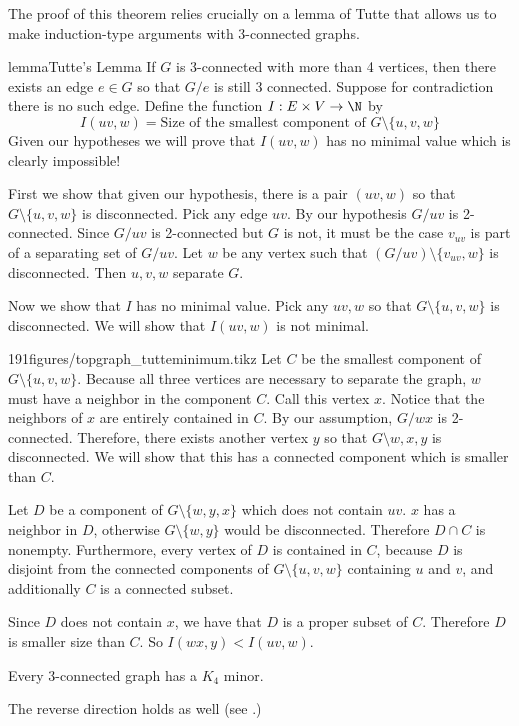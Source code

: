  The proof of this theorem relies crucially on a lemma of Tutte that allows us to make induction-type arguments with 3-connected graphs.
\begin{framedpage}{lemma}{Tutte's Lemma}{\label{lem:graph:tutte}
  If $G$  is 3-connected with more than 4 vertices, then there exists an edge $e\in G$ so that $G/e$ is still 3 connected.}
  Suppose for contradiction there is no such edge. Define the function $I: E\times V \to \N$ by
  \[
   I(uv, w)=\text{Size of the smallest component of $G\setminus \{u,v, w\}$}
  \]
	Given our hypotheses we will prove that $I(uv, w)$ has no minimal value which is clearly impossible!

First we show that given our hypothesis, there is a pair $(uv, w)$ so that $G\setminus\{u, v, w\}$ is disconnected. Pick any edge $uv$. By our hypothesis $G/uv$ is   2-connected. Since $G/uv$ is 2-connected but $G$ is not, it must be the case $v_{uv}$ is part of a separating set of $G/uv$. Let $w$ be any vertex such that $(G/uv)\setminus\{v_{uv}, w\}$ is disconnected. Then $u, v, w$ separate $G$.

Now we show that  $I$ has no minimal value.
Pick any $uv, w$ so that $G\setminus\{u, v, w\}$ is disconnected. 
We will show that $I(uv, w)$ is not minimal.
\begin{paragraphfigureenv}{191figures/topgraph_tutteminimum.tikz}
	Let $C$ be the smallest component of $G\setminus\{u, v, w\}$. Because all three vertices are necessary to separate the graph,  $w$ must have a neighbor in the component $C$. Call this vertex $x$. Notice that the neighbors of $x$ are entirely contained in $C$.
	By our assumption, $G/wx$ is 2-connected.
	Therefore, there exists another vertex $y$ so that $G\setminus{w, x, y}$ is disconnected. We will show that this has a connected component which is smaller than $C$.

	Let $D$ be a component of $G\setminus\{w, y, x\}$ which does not contain $uv$. 
	$x$ has a neighbor in $D$, otherwise $G\setminus\{w, y\}$ would be disconnected.
	Therefore $D\cap C$ is nonempty. 
	Furthermore, every vertex of $D$ is contained in $C$, because $D$ is disjoint from the connected components of $G\setminus\{u,v,w\}$ containing $u$ and $v$, and additionally $C$ is a connected subset.
\end{paragraphfigureenv}
  Since $D$ does not contain $x$, we have that $D$ is a proper subset of $C$. Therefore $D$ is smaller size than $C$.  So $I(wx, y)<I(uv, w)$.
  
	\begin{corollary}
		Every 3-connected graph has a $K_4$ minor. 
	\end{corollary}
	The reverse direction holds as well (see .)
\end{framedpage}
